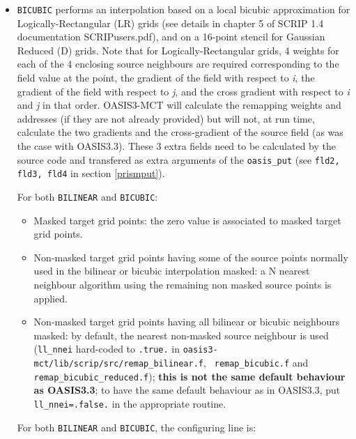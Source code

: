 \begin{itemize}
\begin{itemize}
  \item {\tt BICUBIC} performs an interpolation based on a local
    bicubic approximation for Logically-Rectangular (LR) grids (see
    details in chapter 5 of SCRIP 1.4 documentation SCRIPusers.pdf),
    and on a 16-point stencil for Gaussian Reduced (D) grids.  Note
    that for Logically-Rectangular grids, 4 weights for each of the 4
    enclosing source neighbours are required corresponding to the
    field value at the point, the gradient of the field with respect
    to {\it i}, the gradient of the field with respect to {\it j}, and
    the cross gradient with respect to {\it i} and {\it j} in that
    order. OASIS3-MCT will calculate the remapping weights and
    addresses (if they are not already provided) but will not, at run
    time, calculate the two gradients and the cross-gradient of the
    source field (as was the case with OASIS3.3). These 3 extra fields
    need to be calculated by the source code and transfered as extra
    arguments of the {\tt oasis\_put} (see {\tt fld2, fld3, fld4} in
    section \ref{prismput}).

    For both {\tt BILINEAR} and {\tt BICUBIC}:
    \begin{itemize}
    \item Masked target grid points: the zero value is associated to
      masked target grid points.

    \item Non-masked target grid points having some of the source
      points normally used in the bilinear or bicubic interpolation
      masked: a N nearest neighbour algorithm using the remaining non
      masked source points is applied.

    \item Non-masked target grid points having all bilinear or bicubic
      neighbours masked: by default, the nearest non-masked source
      neighbour is used ({\tt ll\_nnei} hard-coded to {\tt .true.} in
      {\tt oasis3-mct/lib/scrip/src/remap\_bilinear.f}, {\tt
        remap\_bicubic.f} and {\tt remap\_bicubic\_reduced.f}); {\bf
        this is not the same default behaviour as OASIS3.3}; to have
      the same default behaviour as in OASIS3.3, put {\tt
        ll\_nnei=.false.} in the appropriate routine.
    \end{itemize}
 
    For both {\tt BILINEAR} and {\tt BICUBIC}, the configuring line
    is:


\end{itemize}
\end{itemize}
